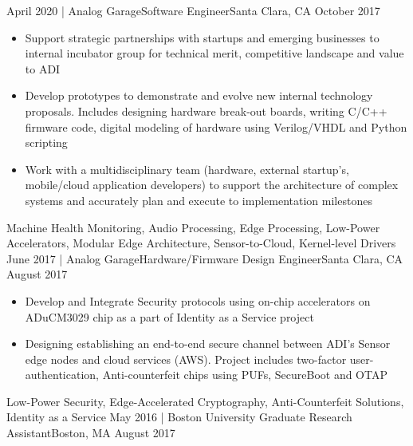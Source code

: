 \begin{experiences}
  \experience
    {April 2020}   {| Analog Garage}{Software Engineer}{Santa Clara, CA}
    {October 2017} {
                      \begin{itemize}
                        \item Support strategic partnerships with startups and emerging businesses to internal incubator group for technical merit, competitive landscape and value to ADI
                        \item Develop prototypes to demonstrate and evolve new internal technology proposals. Includes designing hardware break-out boards, writing C/C++ firmware code, digital modeling of hardware using Verilog/VHDL and Python scripting
                        \item Work with a multidisciplinary team (hardware, external startup’s, mobile/cloud application developers) to support the architecture of complex systems and accurately plan and execute to implementation milestones\\
                      \end{itemize}
                    }
                    {Machine Health Monitoring, Audio Processing, Edge Processing, Low-Power Accelerators, Modular Edge Architecture, Sensor-to-Cloud, Kernel-level Drivers}
  \emptySeparator
  \experience
    {June 2017}       {| Analog Garage}{Hardware/Firmware Design Engineer}{Santa Clara, CA}
    {August 2017}    {
                      \begin{itemize}
                        \item Develop and Integrate Security protocols using on-chip accelerators on ADuCM3029 chip as a part of Identity as a Service project
                        \item Designing establishing an end-to-end secure channel between ADI's Sensor edge nodes and cloud services (AWS). Project includes two-factor user-authentication, Anti-counterfeit chips using PUFs, SecureBoot and OTAP \\
                      \end{itemize}
                    }
                    {Low-Power Security, Edge-Accelerated Cryptography, Anti-Counterfeit Solutions, Identity as a Service}
  \emptySeparator
  \experience
  {May 2016}       {| Boston University}{ Graduate Research Assistant}{Boston, MA}
  {August 2017}    {
}
\end{experiences}
